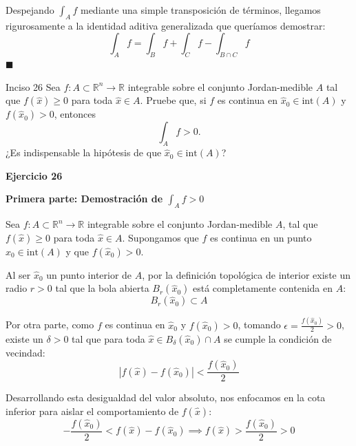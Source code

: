 \documentclass[11pt,letterpaper]{article}
\begin{document}
Despejando $\int_A f$ mediante una simple transposición de términos, llegamos rigurosamente a la identidad aditiva generalizada que queríamos demostrar:
\begin{equation*}
\int_A f = \int_B f + \int_C f - \int_{B \cap C} f
\end{equation*}
\hfill $\blacksquare$

\begin{inciso}{Inciso 26}
Sea $f:A\subset\mathbb{R}^{n}\rightarrow\mathbb{R}$ integrable sobre el conjunto Jordan-medible $A$ tal que $f(\hat{x})\ge 0$ para toda $\hat{x}\in A$. Pruebe que, si $f$ es continua en $\hat{x}_{0}\in \text{int}(A)$ y $f(\hat{x}_{0})>0$, entonces
\begin{equation*}
    \int_{A}f>0.
\end{equation*}
¿Es indispensable la hipótesis de que $\hat{x}_{0}\in \text{int}(A)$?
\end{inciso}

\textbf{Ejercicio 26}

\textbf{Primera parte: Demostración de $\int_A f > 0$}

Sea $f: A \subset \mathbb{R}^n \rightarrow \mathbb{R}$ integrable sobre el conjunto Jordan-medible $A$, tal que $f(\hat{x}) \ge 0$ para toda $\hat{x} \in A$. Supongamos que $f$ es continua en un punto $\hat{x}_0 \in \text{int}(A)$ y que $f(\hat{x}_0) > 0$.

Al ser $\hat{x}_0$ un punto interior de $A$, por la definición topológica de interior existe un radio $r > 0$ tal que la bola abierta $B_r(\hat{x}_0)$ está completamente contenida en $A$:
\begin{equation*}
B_r(\hat{x}_0) \subset A
\end{equation*}

Por otra parte, como $f$ es continua en $\hat{x}_0$ y $f(\hat{x}_0) > 0$, tomando $\epsilon = \frac{f(\hat{x}_0)}{2} > 0$, existe un $\delta > 0$ tal que para toda $\hat{x} \in B_\delta(\hat{x}_0) \cap A$ se cumple la condición de vecindad:
\begin{equation*}
|f(\hat{x}) - f(\hat{x}_0)| < \frac{f(\hat{x}_0)}{2}
\end{equation*}

Desarrollando esta desigualdad del valor absoluto, nos enfocamos en la cota inferior para aislar el comportamiento de $f(\hat{x})$:
\begin{equation*}
-\frac{f(\hat{x}_0)}{2} < f(\hat{x}) - f(\hat{x}_0) \implies f(\hat{x}) > \frac{f(\hat{x}_0)}{2} > 0
\end{equation*}
\end{document}
